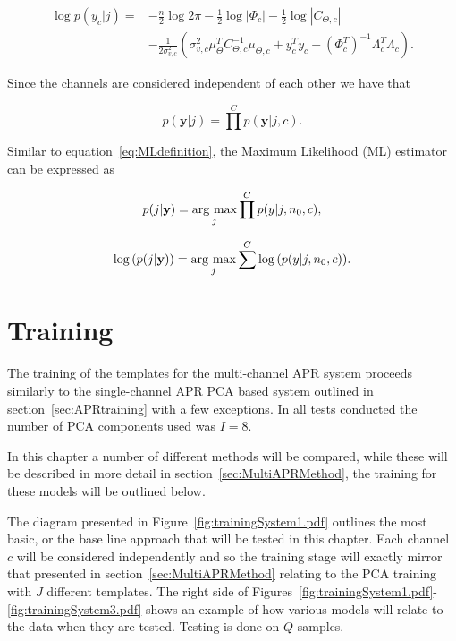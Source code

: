 \begin{equation}\label{eq:loglikeli_c}\begin{split}
\log{p(y_c|j)} = &- \frac{n}{2}\log{2 \pi}- \frac{1}{2}\log{|\Phi_c|} - \frac{1}{2}\log{|C_{\Theta,c}|} \\
& -\frac{1}{2\sigma^2_{v,c}}\left(\sigma_{v,c}^2\mu_\Theta^TC_{\Theta,c}^{-1}\mu_{\Theta,c} + y_c^Ty_c- \left(\Phi_c^T\right)^{-1}\Lambda_c^T\Lambda_c\right).
\end{split}\end{equation}

Since the channels are considered independent of each other we have that

\begin{equation}\label{eq:jointprob_c}
p(\textbf{y} | j) = \prod^C p(\textbf{y} | j, c).
\end{equation}

Similar to equation~\ref{eq:MLdefinition}, the Maximum Likelihood (ML) estimator can be expressed as

\begin{equation}\label{eq:MLdefinition_c}
p(j |\textbf{y}) = \underset{j}{\mathrm{arg~max}} \prod^C p(y|j,n_0,c),
\end{equation}

\begin{equation}\label{eq:MLdefinition2_c}
\log{\left( p(j |\textbf{y})\right)} = \underset{j}{\mathrm{arg~max}} \sum^C \log{\left( p(y|j,n_0,c) \right)}.
\end{equation}

\section{Training}\label{sec:MultiAPRTraining}
The training of the templates for the multi-channel APR system proceeds similarly to the single-channel APR PCA based system outlined in section~\ref{sec:APRtraining} with a few exceptions. In all tests conducted the number of PCA components used was $I = 8$.

In this chapter a number of different methods will be compared, while these will be described in more detail in section~\ref{sec:MultiAPRMethod}, the training for these models will be outlined below.

The diagram presented in Figure~\ref{fig:trainingSystem1.pdf} outlines the most basic, or the base line approach that will be tested in this chapter. Each channel $c$ will be considered independently and so the training stage will exactly mirror that presented in section~\ref{sec:MultiAPRMethod} relating to the PCA training with $J$ different templates. The right side of Figures~\ref{fig:trainingSystem1.pdf}-\ref{fig:trainingSystem3.pdf} shows an example of how various models will relate to the data when they are tested. Testing is done on $Q$ samples.

